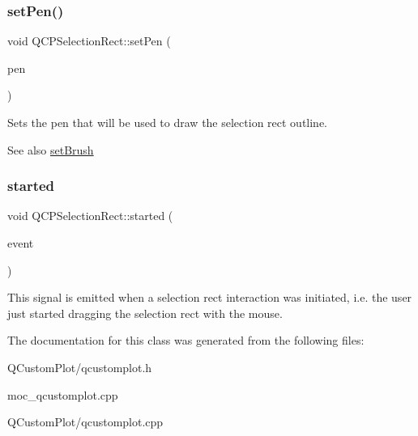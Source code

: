\subsubsection{\texorpdfstring{set\+Pen()}{setPen()}}
{\footnotesize\ttfamily void Q\+C\+P\+Selection\+Rect\+::set\+Pen (\begin{DoxyParamCaption}\item[{const Q\+Pen \&}]{pen }\end{DoxyParamCaption})}

Sets the pen that will be used to draw the selection rect outline.

\begin{DoxySeeAlso}{See also}
\mbox{\hyperlink{class_q_c_p_selection_rect_ab0c66f1484418782efa01f4153611080}{set\+Brush}} 
\end{DoxySeeAlso}
\mbox{\label{class_q_c_p_selection_rect_a7b7162d19f4f2174d3644ff1a5d335aa}} 
\subsubsection{\texorpdfstring{started}{started}}
{\footnotesize\ttfamily void Q\+C\+P\+Selection\+Rect\+::started (\begin{DoxyParamCaption}\item[{Q\+Mouse\+Event $\ast$}]{event }\end{DoxyParamCaption})\hspace{0.3cm}{\ttfamily [signal]}}

This signal is emitted when a selection rect interaction was initiated, i.\+e. the user just started dragging the selection rect with the mouse. 

The documentation for this class was generated from the following files\+:\begin{DoxyCompactItemize}
\item 
Q\+Custom\+Plot/qcustomplot.\+h\item 
moc\+\_\+qcustomplot.\+cpp\item 
Q\+Custom\+Plot/qcustomplot.\+cpp\end{DoxyCompactItemize}
